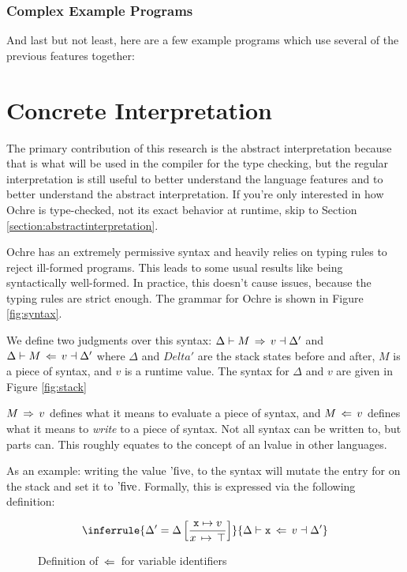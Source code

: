 \documentclass[12pt,twoside]{report}
\begin{document}
\subsubsection{Complex Example Programs}
And last but not least, here are a few example programs which use several of the previous features together:

\cleardoublepage
\section{Concrete Interpretation}
\label{section:concreteinterpretation}
The primary contribution of this research is the abstract interpretation because that is what will be used in the compiler for the type checking, but the regular interpretation is still useful to better understand the language features and to better understand the abstract interpretation. If you're only interested in how Ochre is type-checked, not its exact behavior at runtime, skip to Section \ref{section:abstractinterpretation}.

Ochre has an extremely permissive syntax and heavily relies on typing rules to reject ill-formed programs. This leads to some usual results like  being syntactically well-formed. In practice, this doesn't cause issues, because the typing rules are strict enough. The grammar for Ochre is shown in Figure \ref{fig:syntax}.

We define two judgments over this syntax: $\Delta \vdash M \,\Rightarrow\, v \dashv \Delta'$ and $\Delta \vdash M \,\Leftarrow\, v \dashv \Delta'$ where $\Delta$ and $Delta'$ are the stack states before and after, $M$ is a piece of syntax, and $v$ is a runtime value. The syntax for $\Delta$ and $v$ are given in Figure \ref{fig:stack}


$M \,\Rightarrow\, v$ defines what it means to evaluate a piece of syntax, and $M \,\Leftarrow\, v$ defines what it means to \textit{write} to a piece of syntax. Not all syntax can be written to, but parts can. This roughly equates to the concept of an lvalue in other languages.

As an example: writing the value $\text{'five}$, to the syntax  will mutate the entry for  on the stack and set it to $\text{'five}$. Formally, this is expressed via the following definition:

\begin{figure}[H]
  \begin{gather*}
    \inferrule{
      \Delta' = \Delta\left[\dfrac{\mono{x} \mapsto v}{\absmap{x}{\top}}\right]
    }{
      \Delta \vdash \mono{x} \ewritearrow v \dashv \Delta'
    }
  \end{gather*}
  \caption{Definition of $\,\Leftarrow\,$ for variable identifiers}
\end{figure}
\end{document}
